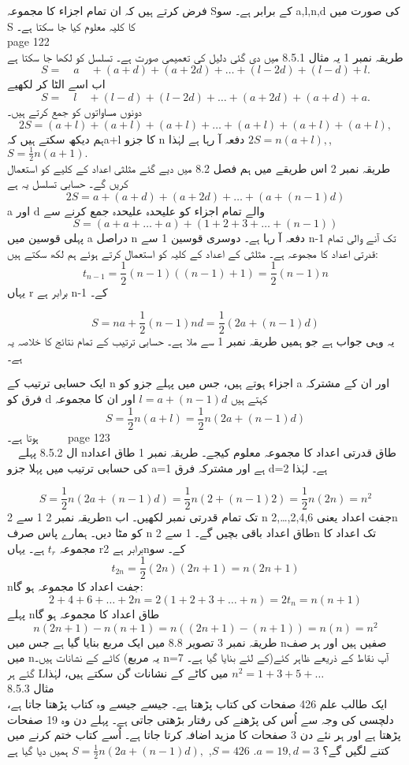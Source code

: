فرض کرتے ہیں کہ ان تمام اجزاء کا مجموعہ Sکے برابر ہے۔  سو  a,l,n,d کی صورت میں S کا کلیہ معلوم کیا جا سکتا ہے۔\\
\clearpage
page 122\\
طریقہ نمبر 1
یہ مثال 8.5.1 میں دی گئی دلیل کی تعمیمی صورت ہے۔ تسلسل کو لکھا جا سکتا ہے
\[S=\quad a \quad+(a+d)+(a+2d)+\dotsc+(l-2d)+(l-d)+l.\]
اب اسے الٹا کر لکھیے
\[S=\quad l \quad +(l-d)+(l-2d)+\dotsc+(a+2d)+(a+d)+a.\]
دونوں مساواتوں کو جمع کرتے ہیں۔
\[2S=(a+l)+(a+l)+(a+l)+\dotsc+(a+l)+(a+l)+(a+l),\]
ہم دیکھ سکتے ہیں کہa+l کا جزو n دفعہ آ رہا ہے لہٰذا
\(2S=n(a+l),\),
\(S=\frac{1}{2}n(a+1).\)\\
طریقہ نمبر 2
اس طریقے میں ہم فصل 8.2 میں دیے گئے مثلثی اعداد کے کلیے کو استعمال کریں گے۔ حسابی تسلسل یہ ہے
\[2S=a+(a+d)+(a+2d)+\dotsc+(a+(n-1)d)\]
a اور d والے تمام اجزاء کو علیحدہ علیحدہ جمع کرنے سے
\[S=(a+a+\dotsc+a)+(1+2+3+\dotsc+(n-1))\]
پہلی قوسین میں a دراصل n دفعہ آ رہا ہے۔ دوسری قوسین 1 سے n-1 تک آنے والی تمام قدرتی اعداد کا مجموعہ ہے۔ مثلثی کے اعداد کے کلیہ کو استعمال کرتے ہوئے ہم لکھ سکتے ہیں:
\[t_{n-1}=\frac{1}{2}(n-1)((n-1)+1)=\frac{1}{2}(n-1)n\]
یہاں r برابر ہے n-1 کے۔

\[S=na+\frac{1}{2}(n-1)nd=\frac{1}{2}(2a+(n-1)d)\]
یہ وہی جواب ہے جو ہمیں طریقہ نمبر 1 سے ملا ہے۔
حسابی ترتیب کے تمام نتائج کا خلاصہ یہ ہے۔

ایک حسابی ترتیب کے n اجزاء ہوتے ہیں، جس میں پہلے جزو کو a اور ان کے مشترکہ فرق کو d کہتے ہیں
\(l=a+(n-1)d\)
اور ان کا مجموعہ
\[S=\frac{1}{2}n(a+l)=\frac{1}{2}n(2a+(n-1)d)\]
ہوتا ہے۔
 \clearpage
 page 123\\
 ال 8.5.2
پہلے nطاق قدرتی اعداد کا مجموعہ معلوم کیجے۔
طریقہ نمبر 1
طاق اعداد کی حسابی ترتیب میں پہلا جزو a=1 ہے اور مشترکہ فرق d=2 ہے۔ لہٰذا

\[S=\frac{1}{2}n(2a+(n-1)d)=\frac{1}{2}n(2+(n-1)2)=\frac{1}{2}n(2n)=n^{2}\]
طریقہ نمبر 2
1 سے 2n تک تمام قدرتی نمبر لکھیں۔ اب n جفت اعداد یعنی 2,4,6,…,2n کو مٹا دیں۔ ہمارے پاس صرف n طاق اعداد باقی بچیں گے۔
1 سے 2n تک اعداد کا مجموعہ 
\(t_{r}\)
 ہے۔ یہاں rبرابر ہے 2nکے۔ سو
\[t_{2n}=\frac{1}{2}(2n)(2n+1)=n(2n+1)\]
nجفت اعداد کا مجموعہ ہو گا:
\[2+4+6+\dotsc+2n=2(1+2+3+\dotsc+n)=2t_{n}=n(n+1)\]
پہلے nطاق اعداد کا مجموعہ ہو گا
\[n(2n+1)-n(n+1)=n((2n+1)-(n+1))=n(n)=n^{2}\]
طریقہ نمبر 3
تصویر 8.8 میں ایک مربع بنایا گیا ہے جس میں nصفیں ہیں اور ہر صف میں nکاٹے کے نشانات ہیں۔ (یہ مربع n=7 کے لئے بنایا گیا ہے۔)آپ نقاط کے ذریعے ظاہر کئے گئے ہر Lمیں کاٹے کے نشانات گن سکتے ہیں، لہٰذا
\(n^{2}=1+3+5+\dotsc\)\\
مثال 8.5.3
\\
ایک طالب علم 426 صفحات کی کتاب پڑھتا ہے۔ جیسے جیسے وہ کتاب پڑھتا جاتا ہے، دلچسی کی وجہ سے اُس کی پڑھنے کی رفتار بڑھتی جاتی ہے۔ پہلے دن وہ 19 صفحات پڑھتا ہے اور ہر نئے دن 3 صفحات کا مزید اضافہ کرتا جاتا ہے۔ اُسے کتاب ختم کرنے میں کتنے لگیں گے؟
\(a=19,d=3\).
\(S=426\),
\(S=\frac{1}{2}n(2a+(n-1)d),\)
ہمیں دیا گیا ہے

